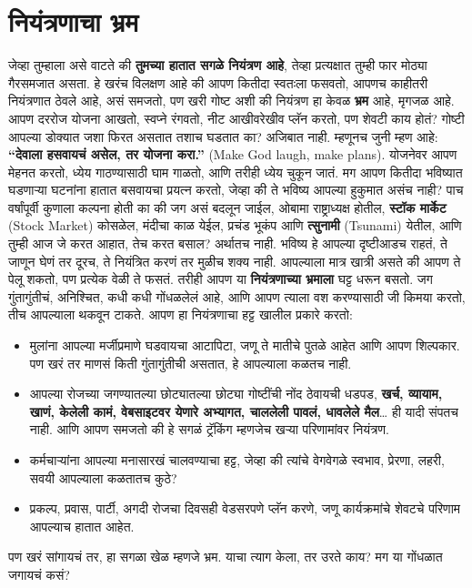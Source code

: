  \chapter{नियंत्रणाचा भ्रम}
जेव्हा तुम्हाला असे वाटते की \textbf{तुमच्या हातात सगळे नियंत्रण आहे}, तेव्हा प्रत्यक्षात तुम्ही फार मोठ्या गैरसमजात असता. हे खरंच विलक्षण आहे की आपण कितीदा स्वतःला फसवतो, आपणच काहीतरी नियंत्रणात ठेवले आहे, असं समजतो, पण खरी गोष्ट अशी की नियंत्रण हा केवळ \textbf{भ्रम} आहे, मृगजळ आहे.
आपण दररोज योजना आखतो, स्वप्ने रंगवतो, नीट आखीवरेखीव प्लॅन करतो, पण शेवटी काय होतं? गोष्टी आपल्या डोक्यात जशा फिरत असतात तशाच घडतात का? अजिबात नाही. म्हणूनच जुनी म्हण आहे: \textbf{“देवाला हसवायचं असेल, तर योजना करा.”} (Make God laugh, make plans). योजनेवर आपण मेहनत करतो, ध्येय गाठण्यासाठी घाम गाळतो, आणि तरीही ध्येय चुकून जातं. मग आपण कितीदा भविष्यात घडणाऱ्या घटनांना हातात बसवायचा प्रयत्न करतो, जेव्हा की ते भविष्य आपल्या हुकुमात असंच नाही?
पाच वर्षांपूर्वी कुणाला कल्पना होती का की जग असं बदलून जाईल, ओबामा राष्ट्राध्यक्ष होतील, \textbf{स्टॉक मार्केट} (Stock Market) कोसळेल, मंदीचा काळ येईल, प्रचंड भूकंप आणि \textbf{त्सुनामी} (Tsunami) येतील, आणि तुम्ही आज जे करत आहात, तेच करत बसाल? अर्थातच नाही. भविष्य हे आपल्या दृष्टीआडच राहतं, ते जाणून घेणं तर दूरच, ते नियंत्रित करणं तर मुळीच शक्य नाही. आपल्याला मात्र खात्री असते की आपण ते पेलू शकतो, पण प्रत्येक वेळी ते फसतं.
तरीही आपण या \textbf{नियंत्रणाच्या भ्रमाला} घट्ट धरून बसतो. जग गुंतागुंतीचं, अनिश्चित, कधी कधी गोंधळलेलं आहे, आणि आपण त्याला वश करण्यासाठी जी किमया करतो, तीच आपल्याला थकवून टाकते.
आपण हा नियंत्रणाचा हट्ट खालील प्रकारे करतो:
 \begin{itemize}
 \item मुलांना आपल्या मर्जीप्रमाणे घडवायचा आटापिटा, जणू ते मातीचे पुतळे आहेत आणि आपण शिल्पकार. पण खरं तर माणसं किती गुंतागुंतीची असतात, हे आपल्याला कळतच नाही.
 \item आपल्या रोजच्या जगण्यातल्या छोट्यातल्या छोट्या गोष्टींची नोंद ठेवायची धडपड, \textbf{खर्च, व्यायाम, खाणं, केलेली कामं, वेबसाइटवर येणारे अभ्यागत, चाललेली पावलं, धावलेले मैल}… ही यादी संपतच नाही. आणि आपण समजतो की हे सगळं ट्रॅकिंग म्हणजेच खऱ्या परिणामांवर नियंत्रण.
 \item कर्मचाऱ्यांना आपल्या मनासारखं चालवण्याचा हट्ट, जेव्हा की त्यांचे वेगवेगळे स्वभाव, प्रेरणा, लहरी, सवयी आपल्याला कळतातच कुठे?
 \item प्रकल्प, प्रवास, पार्टी, अगदी रोजचा दिवसही वेडसरपणे प्लॅन करणे, जणू कार्यक्रमांचे शेवटचे परिणाम आपल्याच हातात आहेत.
 \end{itemize}
पण खरं सांगायचं तर, हा सगळा खेळ म्हणजे भ्रम. याचा त्याग केला, तर उरते काय? मग या गोंधळात जगायचं कसं?
